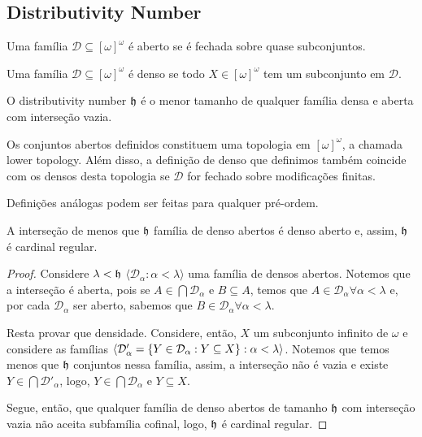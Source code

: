 \subsection{Distributivity Number}

\begin{definition}
    Uma família $\mathcal D \subseteq [\omega]^\omega$ é aberto se é fechada sobre quase subconjuntos. 
\end{definition}

\begin{definition}
    Uma família $\mathcal D \subseteq [\omega]^\omega$ é denso se todo $X\in [\omega]^\omega$ tem um subconjunto em $\mathcal D$.
\end{definition}

\begin{definition}
    O distributivity number $\mathfrak{h}$ é o menor tamanho de qualquer família densa e aberta com interseção vazia.
\end{definition}

\begin{remark}
    Os conjuntos abertos definidos constituem uma topologia em $[\omega]^\omega$, a chamada lower topology. Além disso, a definição de denso que definimos também coincide com os densos desta topologia se $\mathcal D$ for fechado sobre modificações finitas.

    Definições análogas podem ser feitas para qualquer pré-ordem.
\end{remark}

\begin{proposition}
    A interseção de menos que $\mathfrak{h}$ família de denso abertos é denso aberto e, assim, $\mathfrak{h}$ é cardinal regular.
\end{proposition}
\begin{proof}
    Considere $\lambda < \mathfrak{h}$ $\langle \mathcal D_\alpha : \alpha < \lambda \rangle$ uma família de densos abertos. Notemos que a interseção é aberta, pois se $A\in \bigcap \mathcal D_\alpha$ e $B\subseteq A$, temos que $A \in \mathcal D_\alpha \forall \alpha < \lambda$ e, por cada $\mathcal D_\alpha$ ser aberto, sabemos que $B\in \mathcal D_\alpha \forall \alpha < \lambda$.
    
    Resta provar que densidade. Considere, então, $X$ um subconjunto infinito de $\omega$ e considere as famílias $\left\langle \mathcal D'_\alpha = \left\{ Y\in \mathcal D_\alpha : Y\subseteq X \right\} : \alpha < \lambda \right\rangle$. Notemos que temos menos que $\mathfrak{h}$ conjuntos nessa família, assim, a interseção não é vazia e existe $Y \in \bigcap \mathcal D'_\alpha$, logo, $Y\in \bigcap \mathcal D_\alpha$ e $Y \subseteq X$.

    Segue, então, que qualquer família de denso abertos de tamanho $\mathfrak{h}$ com interseção vazia não aceita subfamília cofinal, logo, $\mathfrak{h}$ é cardinal regular. 
\end{proof}

